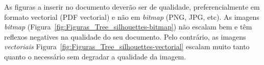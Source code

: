 

As figuras a inserir no documento deverão ser de qualidade, preferencialmente em formato vectorial (PDF vectorial) e não em \emph{bitmap} (PNG, JPG, etc). As imagens \emph{bitmap} (Figura~\ref{fig:Figuras_Tree_silhouettes-bitmap}) não escalam bem e têm reflexos negatives na qualidade do seu documento.  Pelo contrário, as imagens \emph{vectoriais} {Figura~\ref{fig:Figuras_Tree_silhouettes-vectorial}} escalam muito tanto quanto o necessário sem degradar a qualidade da imagem.

